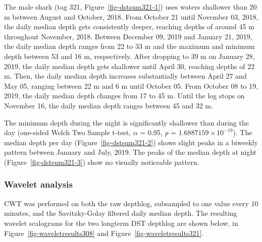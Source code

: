 \documentclass[
  authoryear,
  review,
  3p]{elsarticle}
\begin{document}
The male shark (tag 321, Figure~\ref{fig-dstsum321-1}) uses waters
shallower than 20 m between August and October, 2018. From October 21
until November 03, 2018, the daily median depth gets consistently
deeper, reaching depths of around 45 m throughout November, 2018.
Between December 09, 2019 and January 21, 2019, the daily median depth
ranges from 22 to 33 m and the maximum and minimum depth between 53 and
16 m, respectively. After dropping to 39 m on January 28, 2019, the
daily median depth gets shallower until April 30, reaching depths of 22
m. Then, the daily median depth increases substantially between April 27
and May 05, ranging between 22 m and 6 m until October 05. From October
08 to 19, 2019, the daily median depth changes from 17 to 45 m. Until
the log stops on November 16, the daily median depth ranges between 45
and 32 m.

The minimum depth during the night is significantly shallower than
during the day (one-sided Welch Two Sample t-test, \(\alpha\) = 0.95,
\emph{p} = \ensuremath{1.6887159\times 10^{-19}}). The median depth per
day (Figure~\ref{fig-dstsum321-2}) shows slight peaks in a biweekly
pattern between January and July, 2019. The peaks of the median depth at
night (Figure~\ref{fig-dstsum321-3}) show no visually noticeable
pattern.

\hypertarget{wavelet-analysis}{%
\subsubsection{Wavelet analysis}\label{wavelet-analysis}}

CWT was performed on both the raw depthlog, subsampled to one value
every 10 minutes, and the Savitzky-Golay filtered daily median depth.
The resulting wavelet scalograms for the two longterm DST depthlog are
shown below, in Figure~\ref{fig-waveletresults308} and
Figure~\ref{fig-waveletresults321}.
\end{document}
